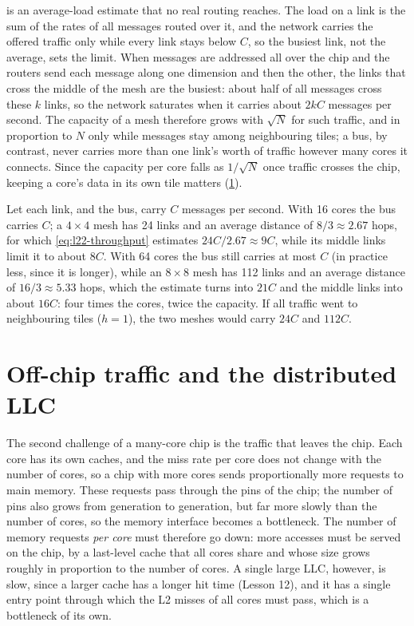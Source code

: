 \documentclass[../main.tex]{subfiles}
\begin{document}
 is an average-load estimate that no real routing
reaches.  The load on a link is the sum of the rates of all messages routed
over it, and the network carries the offered traffic only while every link
stays below $C$, so the busiest link, not the average, sets the
limit.  When
messages are addressed all over the chip and the routers send each message
along one dimension and then the other, the links that cross the middle of
the mesh are the busiest: about half of all messages cross these $k$ links,
so the network saturates when it carries about $2kC$ messages per second.  The capacity of a mesh therefore grows with $\sqrt{N}$ for such
traffic, and in proportion to $N$ only while messages stay among
neighbouring tiles; a bus, by contrast, never carries more than one link's
worth of traffic however many cores it connects.  Since the capacity per
core falls as $1/\sqrt{N}$ once traffic crosses the chip, keeping a core's
data in its own tile matters (\cref{sec:l22-llc}).

\begin{example}
  \label{ex:l22-throughput}
  Let each link, and the bus, carry $C$ messages per second.  With 16 cores
  the bus carries $C$; a $4\times4$ mesh has 24 links and an average
  distance of $8/3\approx 2.67$ hops, for which \cref{eq:l22-throughput}
  estimates $24C/2.67\approx 9C$, while its middle links limit it to about
  $8C$.  With 64 cores the bus still carries at most $C$ (in practice less,
  since it is longer), while an $8\times8$ mesh has 112 links and an average
  distance of $16/3\approx 5.33$ hops, which the estimate turns into $21C$
  and the middle links into about $16C$: four times the cores, twice the
  capacity.  If all traffic went to neighbouring tiles ($h=1$), the two
  meshes would carry $24C$ and $112C$.
\end{example}

\section{Off-chip traffic and the distributed LLC}
\label{sec:l22-llc}

The second challenge of a many-core chip is the traffic that leaves the
chip.  Each core has its own caches, and the miss rate per core does
not change with the number of cores, so a chip with more cores sends
proportionally more requests to main memory.  These requests pass through
the pins of the chip; the number of pins also grows from generation to
generation, but far more slowly than the number of cores, so the memory
interface becomes a bottleneck.  The number of memory requests \emph{per
core} must therefore go down: more accesses must be served on the chip, by
a last-level cache that all cores share and whose size grows roughly in
proportion to the number of cores.  A single large LLC, however, is slow,
since a larger cache has a longer hit time (Lesson 12), and it has a single
entry point through which the L2 misses of all cores must pass, which is a
bottleneck of its own.
\end{document}
